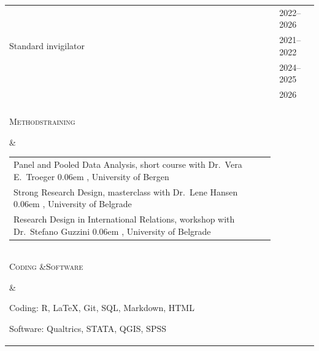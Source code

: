 \documentclass[10pt, a4paper]{article}
\makeatletter
\newcommand{\cvorcidinline}[1]{%
  {\hypersetup{urlcolor=orcidgreen}%
  \kern0.06em
  \href{https://orcid.org/#1}{%
    \raisebox{0.8ex}{\resizebox{!}{1.0ex}{\mbox{\faOrcid}}}}}}%
\newlength{\cvlabelwidth}
\newlength{\cvcontentwidth}
\newlength{\cvdatewidth}
\newlength{\cvdatelinegap}
\newlength{\cvtextbandwidth}
\newlength{\cvsectionabove}
\newlength{\cvproblockbalancetighten}
\newlength{\cvproblockbalanceloosen}
\newcommand{\cvproblockaftersubhead}{\vspace{-\cvproblockbalancetighten}}%
\newcommand{\cvproblockbeforesubhead}{\vspace{\cvproblockbalanceloosen}}%
\newenvironment{cvbody}{%
  \setlength{\extrarowheight}{2pt}%
  \begin{longtable}{%
    @{}
    >{\small\raggedright}p{\cvlabelwidth}
    @{\hspace{6pt}}
    >{\small}p{\cvcontentwidth}
    @{}
  }
}{%
  \end{longtable}%
}
\newcommand{\cvsection}[2]{%
  \noalign{\vspace{\cvsectionabove}}%
  \parbox[t]{\cvlabelwidth}{\raggedright\strut\textsc{#1}} &
  \parbox[t]{\cvcontentwidth}{#2}\tabularnewline
}
\newcommand{\cvdatedline}[2]{%
  \begin{tabular}[t]{@{}%
    >{\raggedright\arraybackslash}p{\cvtextbandwidth}%
    @{\hspace{\cvdatelinegap}}%
    >{\raggedleft\arraybackslash}p{\cvdatewidth}@{}}%
    #1 & #2\tabularnewline
  \end{tabular}%
}
\newenvironment{cvdatedblock}{%
  \begin{tabular}[t]{@{}%
    >{\raggedright\arraybackslash}p{\cvtextbandwidth}%
    @{\hspace{\cvdatelinegap}}%
    >{\raggedleft\arraybackslash}p{\cvdatewidth}@{}}%
}{%
  \end{tabular}%
}
\newcommand{\cvdatedrow}[2]{#1 & #2\tabularnewline}
\makeatother
\begin{document}
\begin{cvbody}
{  \textit{Assessment and Progression}\par
  \cvproblockaftersubhead
  \begin{cvdatedblock}%
  \cvdatedrow{\hspace{1em}Senior invigilator}{2022--2026}%
  \cvdatedrow{\hspace{1em}Standard invigilator}{2021--2022}%
  \end{cvdatedblock}\par
  \cvproblockbeforesubhead
  \textit{Trinity Access Programme}\par
  \cvproblockaftersubhead
  \cvdatedline{\hspace{1em}Tutor}{2024--2025}\par
  \textit{Disability Service}\par
  \cvproblockaftersubhead
  \cvdatedline{\hspace{1em}Tutor}{2026}%
}

\cvsection{Professional\newline Development}{%
  \begin{cvdatedblock}%
  \cvdatedrow{%
    EPSS Mentorship Program (mentor: Dr.~Emma Hoes\cvorcidinline{0000-0002-8063-5430}), EPSS Diversity Committee%
  }{2026--2027}%
  \cvdatedrow{%
    EPSA LGBTQ+ Mentoring Scheme (mentor: Dr.~William L. Allen\cvorcidinline{0000-0003-3185-1468}), EPSA LGBTQ+ Group%
  }{2023--2026}%
  \cvdatedrow{%
    Research Integrity and Impact Certificate, Trinity College Dublin%
  }{2022}%
  \cvdatedrow{%
    Data Protection Certificate, Trinity College Dublin%
  }{2022}%
  \end{cvdatedblock}%
}

\cvsection{Methods\newline training}{%
  \begin{cvdatedblock}%
  \cvdatedrow{%
    Panel and Pooled Data Analysis, short course with Dr.~Vera E.~Troeger\cvorcidinline{0000-0002-6978-3053}, University of Bergen%
  }{2022}%
  \cvdatedrow{%
    Strong Research Design, masterclass with Dr.~Lene Hansen\cvorcidinline{0000-0001-7918-3943}, University of Belgrade%
  }{2019}%
  \cvdatedrow{%
    Research Design in International Relations, workshop with Dr.~Stefano Guzzini\cvorcidinline{0000-0001-7721-6983}, University of Belgrade%
  }{2019}%
  \end{cvdatedblock}%
}

\cvsection{Coding \&\newline Software}{%
  Coding: R, \LaTeX, Git, SQL, Markdown, HTML\par
  Software: Qualtrics, STATA, QGIS, SPSS%
}


\end{cvbody}
\end{document}
